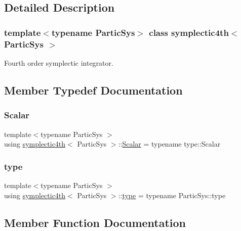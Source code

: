\subsection{Detailed Description}
\subsubsection*{template$<$typename Partic\+Sys$>$\newline
class symplectic4th$<$ Partic\+Sys $>$}

Fourth order symplectic integrator. 

\subsection{Member Typedef Documentation}
\mbox{\label{classsymplectic4th_a272a5a2bb16a90a7ebdad0335a2fac9b}} 
\subsubsection{\texorpdfstring{Scalar}{Scalar}}
{\footnotesize\ttfamily template$<$typename Partic\+Sys $>$ \\
using \mbox{\hyperlink{classsymplectic4th}{symplectic4th}}$<$ Partic\+Sys $>$\+::\mbox{\hyperlink{classsymplectic4th_a272a5a2bb16a90a7ebdad0335a2fac9b}{Scalar}} =  typename type\+::\+Scalar}

\mbox{\label{classsymplectic4th_a5af1033b30e95ca0d08ee8f3c0adabc2}} 
\subsubsection{\texorpdfstring{type}{type}}
{\footnotesize\ttfamily template$<$typename Partic\+Sys $>$ \\
using \mbox{\hyperlink{classsymplectic4th}{symplectic4th}}$<$ Partic\+Sys $>$\+::\mbox{\hyperlink{classsymplectic4th_a5af1033b30e95ca0d08ee8f3c0adabc2}{type}} =  typename Partic\+Sys\+::type}



\subsection{Member Function Documentation}
\mbox{\label{classsymplectic4th_a4ec2375bddd7b3cdff6c675e14a08fe0}} 
